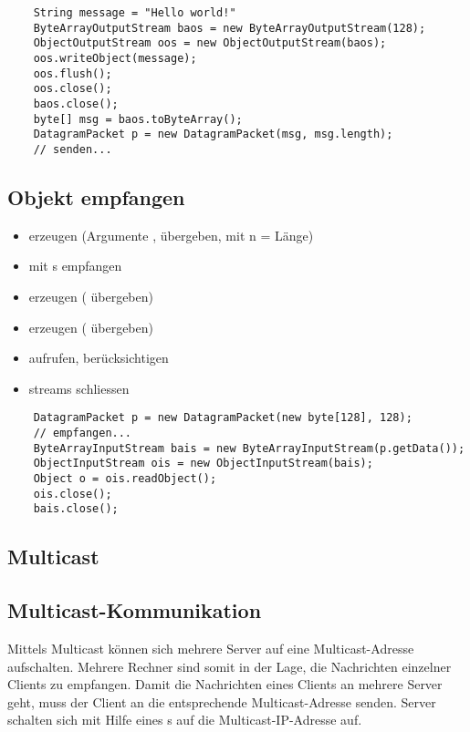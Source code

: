 \begin{verbatim}
    String message = "Hello world!"
    ByteArrayOutputStream baos = new ByteArrayOutputStream(128);
    ObjectOutputStream oos = new ObjectOutputStream(baos);
    oos.writeObject(message);
    oos.flush();
    oos.close();
    baos.close();
    byte[] msg = baos.toByteArray();
    DatagramPacket p = new DatagramPacket(msg, msg.length);
    // senden...
\end{verbatim}

\subsection*{Objekt empfangen}
\begin{itemize}
    \item {}  erzeugen (Argumente ,  übergeben, mit n = Länge)
    \item mit s  empfangen
    \item {}  erzeugen ( übergeben)
    \item {}  erzeugen ( übergeben)
    \item {} aufrufen,  berücksichtigen
    \item streams schliessen
\end{itemize}


\begin{verbatim}
    DatagramPacket p = new DatagramPacket(new byte[128], 128);
    // empfangen...
    ByteArrayInputStream bais = new ByteArrayInputStream(p.getData());
    ObjectInputStream ois = new ObjectInputStream(bais);
    Object o = ois.readObject();
    ois.close();
    bais.close();
\end{verbatim}

\subsection{Multicast}

\subsection*{Multicast-Kommunikation}

Mittels Multicast können sich mehrere Server auf eine Multicast-Adresse aufschalten.
Mehrere Rechner sind somit in der Lage, die Nachrichten einzelner Clients zu empfangen.
Damit die Nachrichten eines Clients an mehrere Server geht, muss der Client an die entsprechende Multicast-Adresse senden.
Server schalten sich mit Hilfe eines s auf die Multicast-IP-Adresse auf.\\

